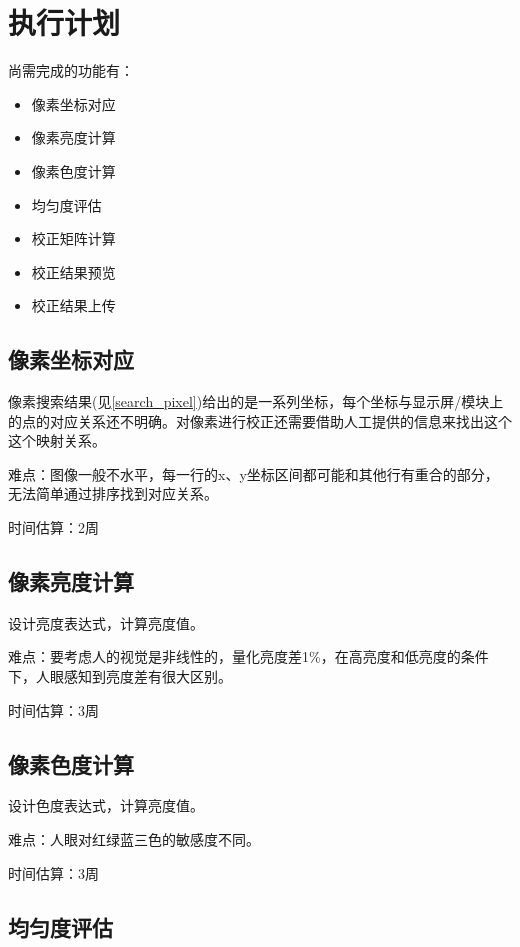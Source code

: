 \section{执行计划}\label{plan}

尚需完成的功能有：

\begin{itemize}
    \item 像素坐标对应
    \item 像素亮度计算
    \item 像素色度计算
    \item 均匀度评估
    \item 校正矩阵计算
    \item 校正结果预览
    \item 校正结果上传
\end{itemize}

\subsection{像素坐标对应}

像素搜索结果(见\ref{search_pixel})给出的是一系列坐标，每个坐标与显示屏/模块上的点的对应关系还不明确。对像素进行校正还需要借助人工提供的信息来找出这个这个映射关系。

难点：图像一般不水平，每一行的x、y坐标区间都可能和其他行有重合的部分，无法简单通过排序找到对应关系。

时间估算：2周

\subsection{像素亮度计算}

设计亮度表达式，计算亮度值。

难点：要考虑人的视觉是非线性的，量化亮度差1\%，在高亮度和低亮度的条件下，人眼感知到亮度差有很大区别。

时间估算：3周

\subsection{像素色度计算}

设计色度表达式，计算亮度值。

难点：人眼对红绿蓝三色的敏感度不同。

时间估算：3周

\subsection{均匀度评估}


